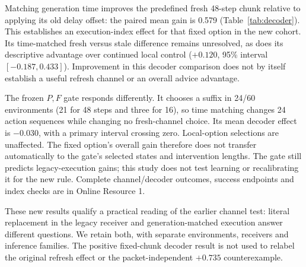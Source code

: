 Matching generation time improves the predefined fresh 48-step chunk relative to applying its old delay offset: the paired mean gain is 0.579 (Table~\ref{tab:decoder}). This establishes an execution-index effect for that fixed option in the new cohort. Its time-matched fresh versus stale difference remains unresolved, as does its descriptive advantage over continued local control ($+0.120$, 95\% interval $[-0.187,0.433]$). Improvement in this decoder comparison does not by itself establish a useful refresh channel or an overall advice advantage.


The frozen $P,F$ gate responds differently. It chooses a suffix in 24/60 environments (21 for 48 steps and three for 16), so time matching changes 24 action sequences while changing no fresh-channel choice. Its mean decoder effect is $-0.030$, with a primary interval crossing zero. Local-option selections are unaffected. The fixed option's overall gain therefore does not transfer automatically to the gate's selected states and intervention lengths. The gate still predicts legacy-execution gains; this study does not test learning or recalibrating it for the new rule. Complete channel/decoder outcomes, success endpoints and index checks are in Online Resource 1.

These new results qualify a practical reading of the earlier channel test: literal replacement in the legacy receiver and generation-matched execution answer different questions. We retain both, with separate environments, receivers and inference families. The positive fixed-chunk decoder result is not used to relabel the original refresh effect or the packet-independent $+0.735$ counterexample.
